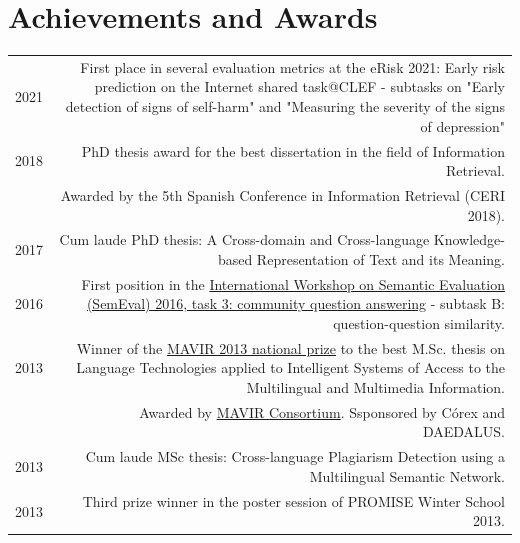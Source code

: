 \documentclass[10pt]{article}
\begin{document}
\section*{Achievements and Awards}
\begin{tabular}{L!{\VRule}R}
	2021 & First place in several evaluation metrics at the eRisk 2021: Early risk prediction on the Internet shared task@CLEF - subtasks on "Early detection of signs of self-harm" and "Measuring the severity of the signs of depression"\vspace{5pt}\\
	2018 & PhD thesis award for the best dissertation in the field of Information Retrieval.\vspace{5pt}\\
	&\scriptsize{Awarded by the 5th Spanish Conference in Information Retrieval (CERI 2018).}\vspace{5pt}\\
	2017 & Cum laude PhD thesis: A Cross-domain and Cross-language Knowledge-based Representation of Text and its Meaning.\vspace{5pt}\\
	2016 & First position in the \href{http://alt.qcri.org/semeval2016/task3/}{International Workshop on Se\-man\-tic Evaluation (SemEval) 2016, task 3: community question answering} - subtask B: question-question similarity.\vspace{5pt}\\
	2013 & Winner of the \href{http://www.mavir.net/premio/182-resuelto-premio-mavir-2013}{MAVIR 2013 national prize} to the best M.Sc. thesis on Language Technologies applied to Intelligent Systems of Access
	to the Multilingual and Multimedia Information.\vspace{5pt}\\
	&\scriptsize{Awarded by \href{http://www.mavir.net/}{MAVIR Consortium}. Ssponsored by C{\'o}rex and DAEDALUS.}\vspace{5pt}\\
	2013 & Cum laude MSc thesis: Cross-language Plagiarism Detection using a Multilingual Se\-man\-tic Network.\vspace{5pt}\\
	
	2013 & Third prize winner in the poster session of PROMISE Winter School 2013.\vspace{5pt}\\
\end{tabular}
\end{document}
